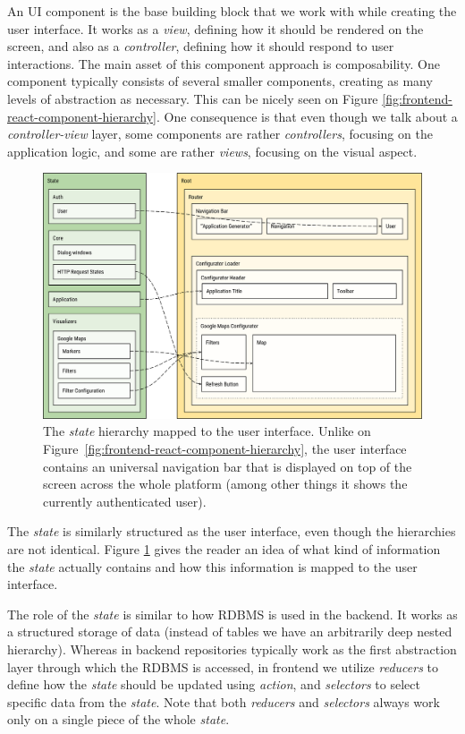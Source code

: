 An UI component is the base building block that we work with while creating the user interface. It works as a \emph{view}, defining how it should be rendered on the screen, and also as a \emph{controller}, defining how it should respond to user interactions. The main asset of this component approach is composability. One component typically consists of several smaller components, creating as many levels of abstraction as necessary. This can be nicely seen  on Figure \ref{fig:frontend-react-component-hierarchy}. One consequence is that even though we talk about a \emph{controller-view} layer, some components are rather \emph{controllers}, focusing on the application logic, and some are rather \emph{views}, focusing on the visual aspect.
\begin{figure}
	\centering
	\includegraphics[width=140mm]{img/04_frontend_state_structure.png}
	\caption{The \emph{state} hierarchy mapped to the user interface. Unlike on Figure~\ref{fig:frontend-react-component-hierarchy}, the user interface contains an universal navigation bar that is displayed on top of the screen across the whole platform (among other things it shows the currently authenticated user).} 
	\label{fig:frontend-state-structure}
\end{figure}

The \emph{state} is similarly structured as the user interface, even though the hierarchies are not identical. Figure \ref{fig:frontend-state-structure} gives the reader an idea of what kind of information the \emph{state} actually contains and how this information is mapped to the user interface. 

The role of the \emph{state} is similar to how RDBMS is used in the backend. It works as a structured storage of data (instead of tables we have an arbitrarily deep nested hierarchy). Whereas in backend repositories typically work as the first abstraction layer through which the RDBMS is accessed, in frontend we utilize \emph{reducers} to define how the \emph{state} should be updated using \emph{action}, and \emph{selectors} to select specific data from the \emph{state}. Note that both \emph{reducers} and \emph{selectors} always work only on a single piece of the whole \emph{state}.

